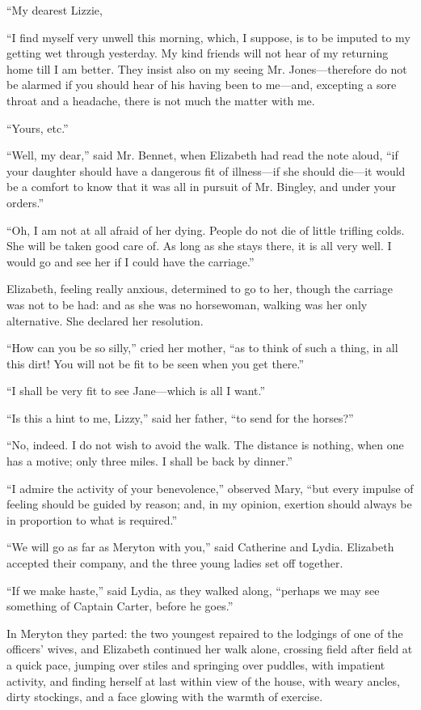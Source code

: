 \documentclass[12pt,openright]{book}
\begin{document}
“My dearest Lizzie,

“I find myself very unwell this morning, which, I suppose, is to be imputed to my getting wet through yesterday. My kind friends will not hear of my returning home till I am better. They insist also on my seeing Mr. Jones—therefore do not be alarmed if you should hear of his having been to me—and, excepting a sore throat and a headache, there is not much the matter with me.

“Yours, etc.”


“Well, my dear,” said Mr. Bennet, when Elizabeth had read the note aloud, “if your daughter should have a dangerous fit of illness—if she should die—it would be a comfort to know that it was all in pursuit of Mr. Bingley, and under your orders.”

“Oh, I am not at all afraid of her dying. People do not die of little trifling colds. She will be taken good care of. As long as she stays there, it is all very well. I would go and see her if I could have the carriage.”

Elizabeth, feeling really anxious, determined to go to her, though the carriage was not to be had: and as she was no horsewoman, walking was her only alternative. She declared her resolution.

“How can you be so silly,” cried her mother, “as to think of such a thing, in all this dirt! You will not be fit to be seen when you get there.”

“I shall be very fit to see Jane—which is all I want.”

“Is this a hint to me, Lizzy,” said her father, “to send for the horses?”

“No, indeed. I do not wish to avoid the walk. The distance is nothing, when one has a motive; only three miles. I shall be back by dinner.”

“I admire the activity of your benevolence,” observed Mary, “but every impulse of feeling should be guided by reason; and, in my opinion, exertion should always be in proportion to what is required.”

“We will go as far as Meryton with you,” said Catherine and Lydia. Elizabeth accepted their company, and the three young ladies set off together.

“If we make haste,” said Lydia, as they walked along, “perhaps we may see something of Captain Carter, before he goes.”

In Meryton they parted: the two youngest repaired to the lodgings of one of the officers’ wives, and Elizabeth continued her walk alone, crossing field after field at a quick pace, jumping over stiles and springing over puddles, with impatient activity, and finding herself at last within view of the house, with weary ancles, dirty stockings, and a face glowing with the warmth of exercise.
\end{document}
